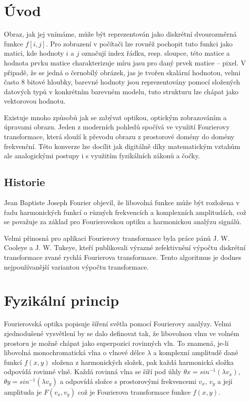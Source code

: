\documentclass[11pt,a4paper]{article}
\newcommand{\titlepageandcontents}{
  

  \pagestyle{plain}
  \pagenumbering{roman}
  \setcounter{page}{1}

  \newpage
  \pagestyle{plain}
  \pagenumbering{arabic}
  \setcounter{page}{1}
}
\begin{document}
\titlepageandcontents
\section{Úvod}
Obraz, jak jej vnímáme, může být reprezentován jako diskrétní dvourozměrná funkce $f[i,j]$.
Pro zobrazení v počítači lze rovněž pochopit tuto funkci jako matici, kde hodnoty $i$ a $j$ 
označují index řádku, resp. sloupce, této matice a hodnota prvku matice charakterizuje míru jasu pro daný
prvek matice -- pixel. V připadě, že se jedná o černobílý obrázek, jas je tvořen skalární hodnotou, 
velmi často 8 bitové hloubky, barevné hodnoty jsou reprezentovány pomocí složených datových typů
v konkrétním barevném modelu, tuto strukturu lze chápat jako vektorovou hodnotu. 

Existuje mnoho způsobů jak se zabývat optikou, optickým zobrazováním a úpravami obrazu.
Jeden z moderních pohledů spočívá ve využití Fourierovy transformace, která slouží k převodu
obrazu z prostorové domény do domény frekvenční. Této konverze lze docílit jak digitálně
díky matematickým vztahům ale analogickými postupy i s využitím fyzikálních zákonů a čočky.

\subsection{Historie}
Jean Baptiste Joseph Fourier objevil, že libovolná funkce může být rozložena v řadu 
harmonických funkcí o různých frekvencích a komplexních amplitudách, což se považuje za základ 
pro Fourierovskou optiku a harmonickou analýzu signálů.

Velmi přinosná pro aplikaci Fourierovy transformace byla práce pánů J. W. Cooleye a J. W. Tukeye,
kteří publikovali výrazné zefektivnění výpočtu diskrétní transformace zvané rychlá Fourierova
transformace. Tento algoritmus je dodnes nejpoužívanější variantou výpočtu transformace.

\section{Fyzikální princip}
Fourierovská optika popisuje šíření světla pomocí Fourierovy analýzy. Velmi zjednodušené vysvětlení by
se dalo definovat tak, že libovolnou vlnu ve volném prostoru je možně chápat jako superpozici rovinných 
vln. To znamená, je-li libovolná monochromatická 
vlna o vlnové délce $\lambda$ a komplexní amplitudě dané funkcí $f(x,y)$ složena z harmonických 
složek, pak každá harmonická složka odpovídá rovinné vlně. Každá rovinná vlna se šíří pod úhly 
$\theta x = sin^{-1}(\lambda v_x)$, $\theta y = sin^{-1}(\lambda v_y)$ a odpovídá složce s prostorovými 
frekvencemi $v_x$, $v_y$  a její amplituda je $F(v_x, v_y)$ což je Fourierova transformace funkce
$f(x,y)$. 
\end{document}
